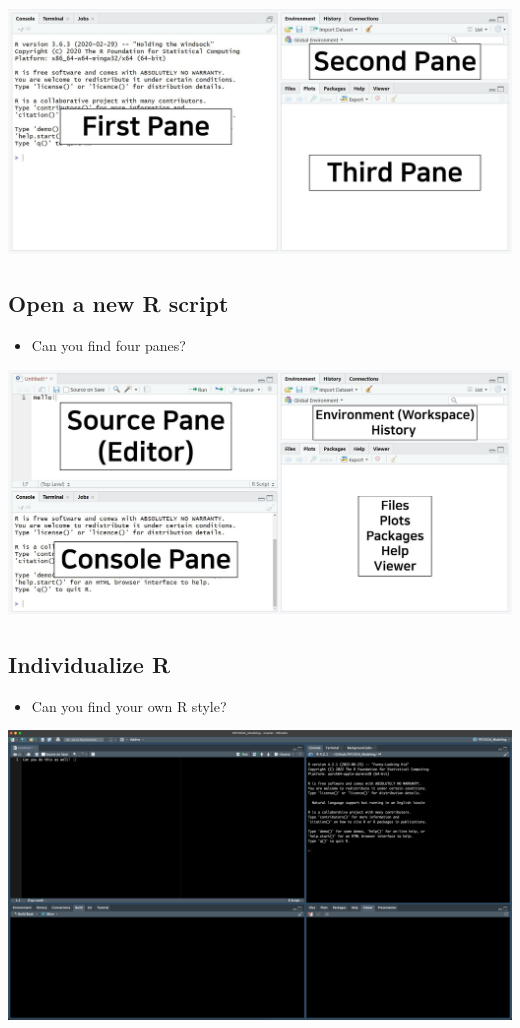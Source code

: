 \documentclass[
]{book}
\providecommand{\tightlist}{%
  \setlength{\itemsep}{0pt}\setlength{\parskip}{0pt}}
\begin{document}
\includegraphics{./img/first_glance.jpg}

\subsection{Open a new R script}\label{open-a-new-r-script}

\begin{itemize}
\tightlist
\item
  Can you find four panes?
\end{itemize}

\includegraphics{./img/second_glance.jpg}

\subsection{Individualize R}\label{individualize-r}

\begin{itemize}
\tightlist
\item
  Can you find your own R style?
\end{itemize}

\includegraphics{./img/third_glance.png}
\end{document}
